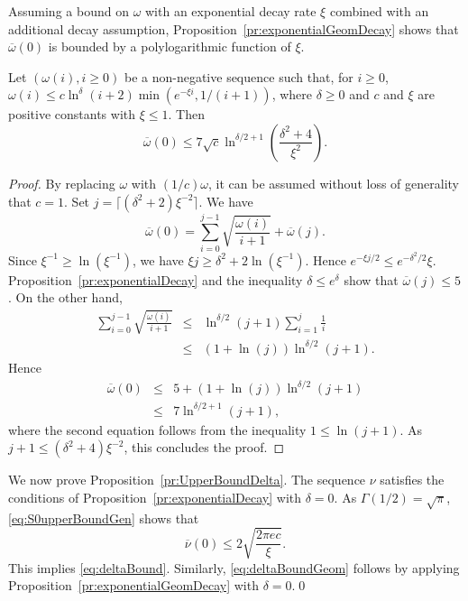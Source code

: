\documentclass[a4paper,11pt]{article}
\begin{document}
Assuming  a bound on   \(\omega\)  with an exponential decay rate  \(\xi\) combined with  an additional decay assumption, Proposition~\ref{pr:exponentialGeomDecay} shows that \(\overline{\omega}(0)\) is bounded by a polylogarithmic function of \(\xi\).
\begin{proposition}\label{pr:exponentialGeomDecay}Let \((\omega(i),i\geq0)\) be  a non-negative sequence such that,  for \(i\geq0\), \(\omega(i)\le c\ln^{\delta}(i+2)\min( e^{-\xi i},1/(i+1))\), where  \(\delta\geq0\) and  \(c\) and \(\xi\) are positive constants with \(\xi\leq1\). Then\begin{displaymath}
\overline{\omega}(0)\leq7\sqrt{ c}\ln^{\delta/2+1}\left(\frac{{\delta}^2+4}{\xi^{2}}\right).
\end{displaymath}
\end{proposition}
\begin{proof}By replacing \(\omega\) with \((1/c)\omega\), it can be assumed without loss of generality that \(c=1\). Set \(j=\lceil({\delta}^2+2)\xi^{-2}\rceil\). We have
\begin{equation*}
\overline{\omega}(0)=\sum^{j-1}_{i=0}\sqrt{\frac{\omega(i)}{i+1}}+\overline{\omega}(j).
\end{equation*}
Since \(\xi^{-1}\ge\ln(\xi^{-1})\), we have \(\xi j\geq{\delta}^2+2\ln(\xi^{-1})\). Hence \(e^{-\xi j/2}\le e^{-\delta^{2}/2}\xi\).  Proposition~\ref{pr:exponentialDecay} and the inequality \(\delta \leq e^{\delta}\) show  that \(\overline{\omega}(j)\le5\). On the other hand, 
\begin{eqnarray*}\sum^{j-1}_{i=0}\sqrt{\frac{\omega(i)}{i+1}}&\le&\ln^{\delta/2}(j+1)\sum^{j}_{i=1}\frac{1}{i}\\
&\le&(1+\ln(j))\ln^{\delta/2}(j+1).\end{eqnarray*}
Hence\begin{eqnarray*}
\overline{\omega}(0)&\leq&5+(1+\ln(j))\ln^{\delta/2}(j+1)\\
&\le&7\ln^{\delta/2+1}(j+1),
\end{eqnarray*}   where the second equation follows from the inequality \(1\leq\ln(j+1)\). As \(j+1\le({\delta}^2+4)\xi^{-2}\), this concludes the proof.
\end{proof}
We now prove Proposition~\ref{pr:UpperBoundDelta}. The sequence \(\nu\) satisfies the conditions of Proposition~\ref{pr:exponentialDecay} with \(\delta=0\). As  \(\Gamma(1/2)=\sqrt{\pi}\), \eqref{eq:S0upperBoundGen} shows that  \begin{equation*}
\overline{\nu}(0)\leq2\sqrt{\frac{2\pi e c}{\xi}}.
\end{equation*}
This implies \eqref{eq:deltaBound}.
Similarly, \eqref{eq:deltaBoundGeom} follows by applying Proposition~\ref{pr:exponentialGeomDecay} with \(\delta=0\).\qed
\end{document}
